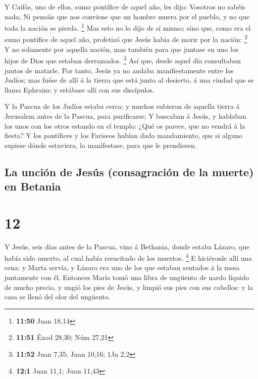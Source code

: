  Y Caifás, uno de ellos, sumo pontífice de aquel año, les
dijo: Vosotros no sabéis nada;  Ni pensáis que nos
conviene que un hombre muera por el pueblo, y no que toda la nación se
pierda. \footnote{\textbf{11:50} Juan 18,14}  Mas esto no
lo dijo de sí mismo; sino que, como era el sumo pontífice de aquel año,
profetizó que Jesús había de morir por la nación: \footnote{\textbf{11:51}
  Éxod 28,30; Núm 27,21}  Y no solamente por aquella
nación, mas también para que juntase en uno los hijos de Dios que
estaban derramados. \footnote{\textbf{11:52} Juan 7,35; Juan 10,16; 1Jn
  2,2}  Así que, desde aquel día consultaban juntos de
matarle.  Por tanto, Jesús ya no andaba manifiestamente
entre los Judíos; mas fuése de allí á la tierra que está junto al
desierto, á una ciudad que se llama Ephraim: y estábase allí con sus
discípulos.

 Y la Pascua de los Judíos estaba cerca: y muchos
subieron de aquella tierra á Jerusalem antes de la Pascua, para
purificarse;  Y buscaban á Jesús, y hablaban los unos con
los otros estando en el templo: ¿Qué os parece, que no vendrá á la
fiesta?  Y los pontífices y los Fariseos habían dado
mandamiento, que si alguno supiese dónde estuviera, lo manifestase, para
que le prendiesen.

\hypertarget{la-unciuxf3n-de-jesuxfas-consagraciuxf3n-de-la-muerte-en-betania}{%
\subsection{La unción de Jesús (consagración de la muerte) en
Betania}\label{la-unciuxf3n-de-jesuxfas-consagraciuxf3n-de-la-muerte-en-betania}}

\hypertarget{section-11}{%
\section{12}\label{section-11}}

 Y Jesús, seis días antes de la Pascua, vino á Bethania,
donde estaba Lázaro, que había sido muerto, al cual había resucitado de
los muertos. \footnote{\textbf{12:1} Juan 11,1; Juan 11,43}
 E hiciéronle allí una cena: y Marta servía, y Lázaro era
uno de los que estaban sentados á la mesa juntamente con él.
 Entonces María tomó una libra de ungüento de nardo
líquido de mucho precio, y ungió los pies de Jesús, y limpió sus pies
con sus cabellos: y la casa se llenó del olor del ungüento.

